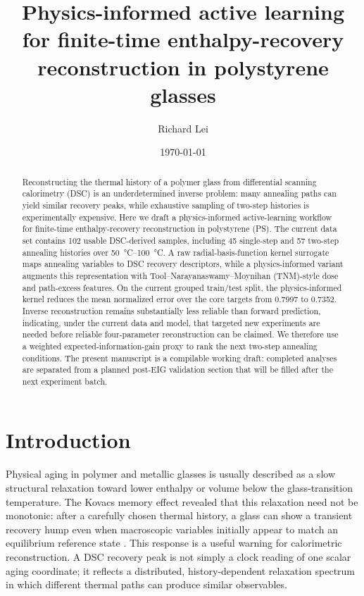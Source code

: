 \documentclass[11pt]{article}
\title{Physics-informed active learning for finite-time enthalpy-recovery reconstruction in polystyrene glasses}
\author{Richard Lei}
\date{\today}
\begin{document}
\maketitle

\begin{abstract}
Reconstructing the thermal history of a polymer glass from differential scanning calorimetry (DSC) is an underdetermined inverse problem: many annealing paths can yield similar recovery peaks, while exhaustive sampling of two-step histories is experimentally expensive. Here we draft a physics-informed active-learning workflow for finite-time enthalpy-recovery reconstruction in polystyrene (PS). The current data set contains 102 usable DSC-derived samples, including 45 single-step and 57 two-step annealing histories over \SIrange{50}{100}{\celsius}. A raw radial-basis-function kernel surrogate maps annealing variables to DSC recovery descriptors, while a physics-informed variant augments this representation with Tool--Narayanaswamy--Moynihan (TNM)-style dose and path-excess features. On the current grouped train/test split, the physics-informed kernel reduces the mean normalized error over the core targets from 0.7997 to 0.7352. Inverse reconstruction remains substantially less reliable than forward prediction, indicating, under the current data and model, that targeted new experiments are needed before reliable four-parameter reconstruction can be claimed. We therefore use a weighted expected-information-gain proxy to rank the next two-step annealing conditions. The present manuscript is a compilable working draft: completed analyses are separated from a planned post-EIG validation section that will be filled after the next experiment batch.
\end{abstract}

\section{Introduction}
Physical aging in polymer and metallic glasses is usually described as a slow structural relaxation toward lower enthalpy or volume below the glass-transition temperature. The Kovacs memory effect revealed that this relaxation need not be monotonic: after a carefully chosen thermal history, a glass can show a transient recovery hump even when macroscopic variables initially appear to match an equilibrium reference state \citep{kovacs1963transition}. This response is a useful warning for calorimetric reconstruction. A DSC recovery peak is not simply a clock reading of one scalar aging coordinate; it reflects a distributed, history-dependent relaxation spectrum in which different thermal paths can produce similar observables.
\end{document}
